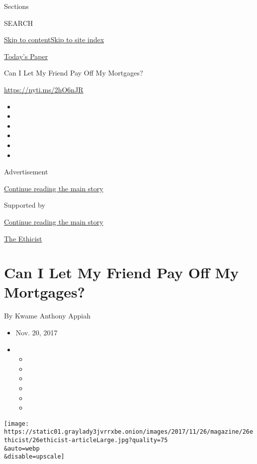 Sections

SEARCH

\protect\hyperlink{site-content}{Skip to
content}\protect\hyperlink{site-index}{Skip to site index}

\href{https://myaccount.nytimes3xbfgragh.onion/auth/login?response_type=cookie\&client_id=vi}{}

\href{https://www.nytimes3xbfgragh.onion/section/todayspaper}{Today's
Paper}

Can I Let My Friend Pay Off My Mortgages?

\url{https://nyti.ms/2hO6nJR}

\begin{itemize}
\item
\item
\item
\item
\item
\item
\end{itemize}

Advertisement

\protect\hyperlink{after-top}{Continue reading the main story}

Supported by

\protect\hyperlink{after-sponsor}{Continue reading the main story}

\href{/column/the-ethicist}{The Ethicist}

\hypertarget{can-i-let-my-friend-pay-off-my-mortgages}{%
\section{Can I Let My Friend Pay Off My
Mortgages?}\label{can-i-let-my-friend-pay-off-my-mortgages}}

By Kwame Anthony Appiah

\begin{itemize}
\item
  Nov. 20, 2017
\item
  \begin{itemize}
  \item
  \item
  \item
  \item
  \item
  \item
  \end{itemize}
\end{itemize}

\texttt{[image: https://static01.graylady3jvrrxbe.onion/images/2017/11/26/magazine/26ethicist/26ethicist-articleLarge.jpg?quality=75\\\&auto=webp\\\&disable=upscale]}

